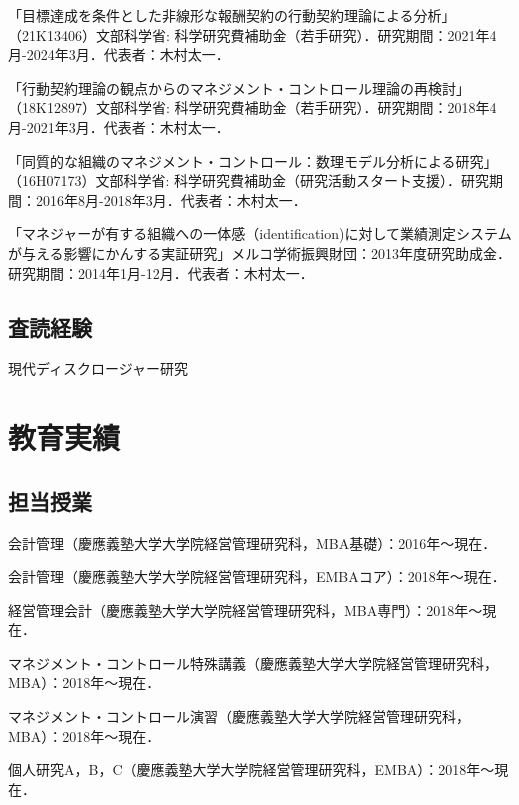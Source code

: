 \documentclass[letterpaper,uplatex]{article}
\renewenvironment{itemize}{
  \begin{list}{}{
    \setlength{\leftmargin}{1.5em}
  }
}{
  \end{list}
}
\begin{document}
\begin{itemize}
\item 「目標達成を条件とした非線形な報酬契約の行動契約理論による分析」（21K13406）文部科学省: 科学研究費補助金（若手研究）．研究期間：2021年4月-2024年3月．代表者：木村太一．

\item 「行動契約理論の観点からのマネジメント・コントロール理論の再検討」（18K12897）文部科学省: 科学研究費補助金（若手研究）．研究期間：2018年4月-2021年3月．代表者：木村太一．

\item 「同質的な組織のマネジメント・コントロール：数理モデル分析による研究」（16H07173）文部科学省: 科学研究費補助金（研究活動スタート支援）．研究期間：2016年8月-2018年3月．代表者：木村太一．

\item 「マネジャーが有する組織への一体感（identification)に対して業績測定システムが与える影響にかんする実証研究」メルコ学術振興財団：2013年度研究助成金．研究期間：2014年1月-12月．代表者：木村太一．
\end{itemize}

\subsection*{査読経験}
    \begin{itemize}
        \item 現代ディスクロージャー研究
    \end{itemize}

\section*{教育実績}

\subsection*{担当授業}

\begin{itemize}
    \item 会計管理（慶應義塾大学大学院経営管理研究科，MBA基礎）：2016年〜現在．
    \item 会計管理（慶應義塾大学大学院経営管理研究科，EMBAコア）：2018年〜現在．
    \item 経営管理会計（慶應義塾大学大学院経営管理研究科，MBA専門）：2018年〜現在．
    \item マネジメント・コントロール特殊講義（慶應義塾大学大学院経営管理研究科，MBA）：2018年〜現在．
    \item マネジメント・コントロール演習（慶應義塾大学大学院経営管理研究科，MBA）：2018年〜現在．
    \item 個人研究A，B，C（慶應義塾大学大学院経営管理研究科，EMBA）：2018年〜現在．
\end{itemize}
\end{document}

